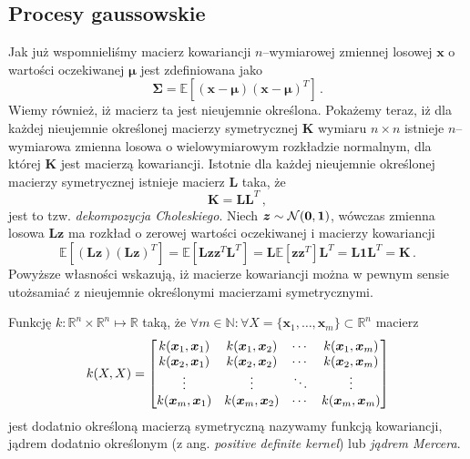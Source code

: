 \documentclass{myclass}
\numberwithin{equation}{subsection}
\begin{document}
\subsection{Procesy gaussowskie}

Jak już wspomnieliśmy macierz kowariancji \(n\)--wymiarowej zmiennej losowej \(\bm{x}\) o wartości
oczekiwanej \(\bm{\mu}\) jest zdefiniowana jako
\begin{equation}
    \bm{\Sigma} = \mathbb{E}\left[(\bm{x} - \bm{\mu})(\bm{x} - \bm{\mu})^T\right]\,.
\end{equation}
Wiemy również, iż macierz ta jest nieujemnie określona. Pokażemy teraz, iż dla każdej nieujemnie
określonej macierzy symetrycznej \(\bm{K}\) wymiaru \(n\times n\) istnieje \(n\)--wymiarowa zmienna
losowa o wielowymiarowym rozkładzie normalnym, dla której \(\bm{K}\) jest macierzą kowariancji.
Istotnie dla każdej nieujemnie określonej macierzy symetrycznej istnieje macierz \(\bm{L}\) taka, że
\begin{equation}
    \bm{K} = \bm{L}\bm{L}^T\,,
\end{equation}
jest to tzw. \emph{dekompozycja Choleskiego}. Niech \(\bm{z} \sim \mathcal{N}(\bm{0}, \bm{1})\), wówczas
zmienna losowa \(\bm{L}\bm{z}\) ma rozkład o zerowej wartości oczekiwanej i macierzy kowariancji
\begin{equation}
    \mathbb{E}\left[(\bm{L}\bm{z})(\bm{L}\bm{z})^T\right] = \mathbb{E}\left[\bm{L}\bm{z}\bm{z}^T\bm{L}^T\right] = \bm{L}\mathbb{E}[\bm{z}\bm{z}^T]\bm{L}^T = \bm{L}\bm{1}\bm{L}^T = \bm{K}\,.
\end{equation}
Powyższe własności wskazują, iż macierze kowariancji można w pewnym sensie utożsamiać z nieujemnie
określonymi macierzami symetrycznymi.

\begin{definition}
Funkcję \(k: \mathbb{R}^n\times\mathbb{R}^n\mapsto\mathbb{R}\) taką, że \(\forall m\in\mathbb{N} :
\forall X = \{\bm{x}_1,\ldots,\bm{x}_m\} \subset \mathbb{R}^n\) macierz
\begin{equation*}
    k(X,X) = \mqty[k(\bm{x}_1, \bm{x}_1) & k(\bm{x}_1, \bm{x}_2) & \cdots & k(\bm{x}_1, \bm{x}_m)\\
    k(\bm{x}_2, \bm{x}_1) & k(\bm{x}_2, \bm{x}_2) & \cdots & k(\bm{x}_2, \bm{x}_m)\\
    \vdots & \vdots & \ddots & \vdots\\
    k(\bm{x}_m, \bm{x}_1) & k(\bm{x}_m, \bm{x}_2) & \cdots & k(\bm{x}_m, \bm{x}_m)\\]
\end{equation*}
jest dodatnio określoną macierzą symetryczną nazywamy funkcją kowariancji, jądrem dodatnio
określonym (z ang. \textit{positive definite kernel}) lub \emph{jądrem Mercera}.
\end{definition}
\end{document}
